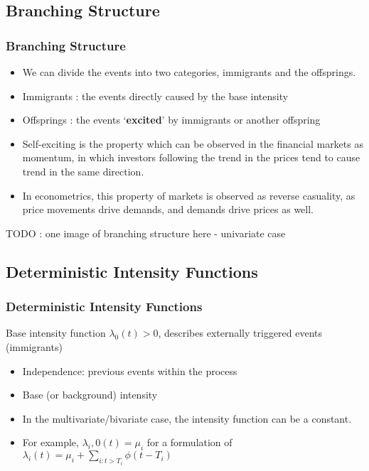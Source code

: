 \documentclass{beamer}
\begin{document}
\subsection{Branching Structure}
\begin{frame}
\frametitle{Branching Structure}
\begin{itemize}
	\item We can divide the events into two categories, immigrants and the offsprings.
	\item Immigrants : the events directly caused by the base intensity
	\item Offsprings : the events `\textbf{excited}' by immigrants or another offspring
	\item Self-exciting is the property which can be observed in the financial markets as momentum, in which investors following the trend in the prices tend to cause trend in the same direction.
	\item In econometrics, this property of markets is observed as reverse casuality, as price movements drive demands, and demands drive prices as well.
\end{itemize}
TODO : one image of branching structure here - univariate case
\end{frame}

\subsection{Deterministic Intensity Functions}
\begin{frame}
\frametitle{Deterministic Intensity Functions}
Base intensity function $\lambda_0(t)>0$, describes externally triggered events (immigrants)
\begin{itemize}
	\item Independence: previous events within the process
	\item Base (or background) intensity
	\item In the multivariate/bivariate case, the intensity function can be a constant.
	\item For example, $\lambda_i,0(t) = \mu_i$ for a formulation of $\lambda_i(t) = \mu_i + \sum_{i: t > T_i} \phi(t - T_i)$
\end{itemize}
\end{frame}
\end{document}
